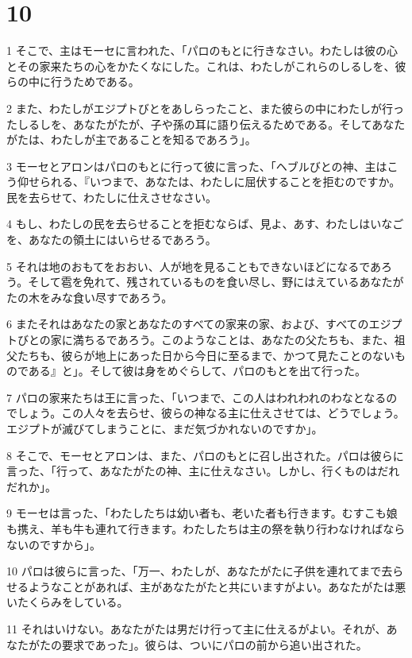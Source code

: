 \chapter{10}

\par 1 そこで、主はモーセに言われた、「パロのもとに行きなさい。わたしは彼の心とその家来たちの心をかたくなにした。これは、わたしがこれらのしるしを、彼らの中に行うためである。
\par 2 また、わたしがエジプトびとをあしらったこと、また彼らの中にわたしが行ったしるしを、あなたがたが、子や孫の耳に語り伝えるためである。そしてあなたがたは、わたしが主であることを知るであろう」。
\par 3 モーセとアロンはパロのもとに行って彼に言った、「ヘブルびとの神、主はこう仰せられる、『いつまで、あなたは、わたしに屈伏することを拒むのですか。民を去らせて、わたしに仕えさせなさい。
\par 4 もし、わたしの民を去らせることを拒むならば、見よ、あす、わたしはいなごを、あなたの領土にはいらせるであろう。
\par 5 それは地のおもてをおおい、人が地を見ることもできないほどになるであろう。そして雹を免れて、残されているものを食い尽し、野にはえているあなたがたの木をみな食い尽すであろう。
\par 6 またそれはあなたの家とあなたのすべての家来の家、および、すべてのエジプトびとの家に満ちるであろう。このようなことは、あなたの父たちも、また、祖父たちも、彼らが地上にあった日から今日に至るまで、かつて見たことのないものである』と」。そして彼は身をめぐらして、パロのもとを出て行った。
\par 7 パロの家来たちは王に言った、「いつまで、この人はわれわれのわなとなるのでしょう。この人々を去らせ、彼らの神なる主に仕えさせては、どうでしょう。エジプトが滅びてしまうことに、まだ気づかれないのですか」。
\par 8 そこで、モーセとアロンは、また、パロのもとに召し出された。パロは彼らに言った、「行って、あなたがたの神、主に仕えなさい。しかし、行くものはだれだれか」。
\par 9 モーセは言った、「わたしたちは幼い者も、老いた者も行きます。むすこも娘も携え、羊も牛も連れて行きます。わたしたちは主の祭を執り行わなければならないのですから」。
\par 10 パロは彼らに言った、「万一、わたしが、あなたがたに子供を連れてまで去らせるようなことがあれば、主があなたがたと共にいますがよい。あなたがたは悪いたくらみをしている。
\par 11 それはいけない。あなたがたは男だけ行って主に仕えるがよい。それが、あなたがたの要求であった」。彼らは、ついにパロの前から追い出された。
